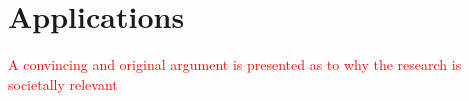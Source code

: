 \section{Applications}
\label{sec:intro_applications}
\textcolor{red}{A convincing and original argument is presented as to why the research is societally relevant}


















